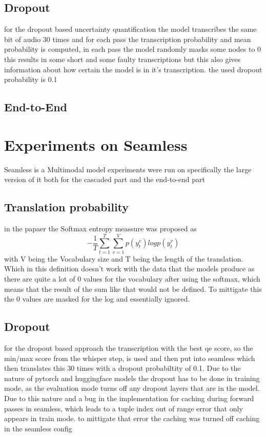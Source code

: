\section{Dropout}
for the dropout based uncertainty quantification the model transcribes the same bit of audio 30 times and for each pass the transcription probability and mean probability is computed, in each pass the model randomly masks some nodes to 0
this results in some short and some faulty transcriptions but this also gives information about how certain the model is in it's transcription. the used dropout probability is 0.1 


\section{End-to-End}


\chapter{Experiments on Seamless}
Seamless is a Multimodal model 
experiments were run on \cite{seamless2023} specifically the large version of it both for the cascaded part and the end-to-end part


\section{Translation probability}
in the \cite{fomicheva2020unsupervised} papaer the Softmax entropy meassure was proposed as $$-\frac{1}{T}\sum_{t=1}^T\sum_{v=1}^Vp(y_t^v)logp(y_t^v)$$ with V being the Vocabulary size and T being the length of the translation. Which in this definition doesn't work with the data that the models produce as there are quite a lot of 0 values for the vocabulary after using the softmax, which means that the result of the sum like that would not be defined. To mittigate this the 0 values are masked for the log and essentially ignored. 


\section{Dropout}
for the dropout based approach the transcription with the best qe score, so the min/max score from the whisper step, is used 
and then put into seamless which then translates this 30 times with a dropout probabiltity of 0.1.
Due to the nature of pytorch and huggingface models the dropout has to be done in training mode, as the evaluation mode turns off any dropout layers that are in the model. Due to this nature and a bug in the implementation for caching during forward passes in seamless, which leads to a tuple index out of range error that only appears in train mode. to mittigate that error the caching was turned off caching in the seamless config


